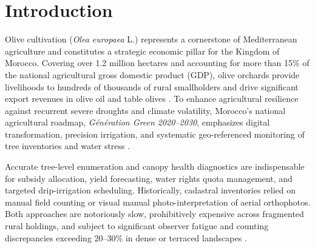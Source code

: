 \documentclass[runningheads]{llncs}
\begin{document}
\section{Introduction}
Olive cultivation (\textit{Olea europaea} L.) represents a cornerstone of Mediterranean agriculture and constitutes a strategic economic pillar for the Kingdom of Morocco. Covering over 1.2 million hectares and accounting for more than 15\% of the national agricultural gross domestic product (GDP), olive orchards provide livelihoods to hundreds of thousands of rural smallholders and drive significant export revenues in olive oil and table olives \cite{ref1,ref2}. To enhance agricultural resilience against recurrent severe droughts and climate volatility, Morocco's national agricultural roadmap, \textit{Génération Green 2020--2030}, emphasizes digital transformation, precision irrigation, and systematic geo-referenced monitoring of tree inventories and water stress \cite{ref3}.

Accurate tree-level enumeration and canopy health diagnostics are indispensable for subsidy allocation, yield forecasting, water rights quota management, and targeted drip-irrigation scheduling. Historically, cadastral inventories relied on manual field counting or visual manual photo-interpretation of aerial orthophotos. Both approaches are notoriously slow, prohibitively expensive across fragmented rural holdings, and subject to significant observer fatigue and counting discrepancies exceeding 20--30\% in dense or terraced landscapes \cite{ref4}. 
\end{document}
